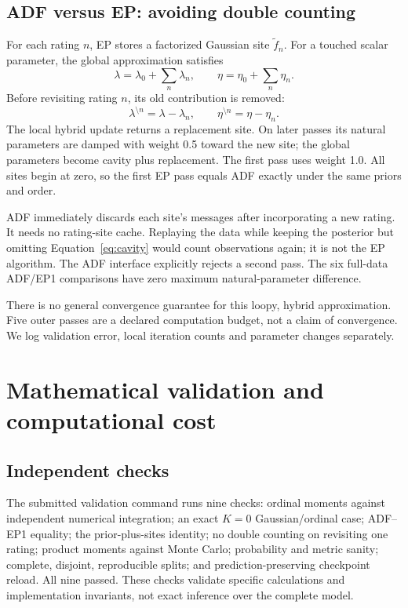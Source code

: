 \documentclass[11pt,a4paper]{article}
\begin{document}
\subsection{ADF versus EP: avoiding double counting}
For each rating $n$, EP stores a factorized Gaussian site $\widetilde f_n$.
For a touched scalar parameter, the global approximation satisfies
\begin{equation}
\lambda=\lambda_0+\sum_n\lambda_n,\qquad
\eta=\eta_0+\sum_n\eta_n.\label{eq:site_sum}
\end{equation}
Before revisiting rating $n$, its old contribution is removed:
\begin{equation}
\lambda^{\setminus n}=\lambda-\lambda_n,\qquad
\eta^{\setminus n}=\eta-\eta_n.\label{eq:cavity}
\end{equation}
The local hybrid update returns a replacement site. On later passes its natural
parameters are damped with weight 0.5 toward the new site; the global parameters
become cavity plus replacement. The first pass uses weight 1.0. All sites begin
at zero, so the first EP pass equals ADF exactly under the same priors and order.

ADF immediately discards each site's messages after incorporating a new rating.
It needs no rating-site cache. Replaying the data while keeping the posterior
but omitting Equation~\ref{eq:cavity} would count observations again; it is not
the EP algorithm. The ADF interface explicitly rejects a second pass. The six
full-data ADF/EP1 comparisons have zero maximum natural-parameter difference.

There is no general convergence guarantee for this loopy, hybrid approximation.
Five outer passes are a declared computation budget, not a claim of convergence.
We log validation error, local iteration counts and parameter changes separately.

\section{Mathematical validation and computational cost}
\subsection{Independent checks}
The submitted validation command runs nine checks: ordinal moments against
independent numerical integration; an exact $K=0$ Gaussian/ordinal case;
ADF--EP1 equality; the prior-plus-sites identity; no double counting on revisiting
one rating; product moments against Monte Carlo; probability and metric sanity;
complete, disjoint, reproducible splits; and prediction-preserving checkpoint
reload. All nine passed. These checks validate specific calculations and
implementation invariants, not exact inference over the complete model.
\end{document}
